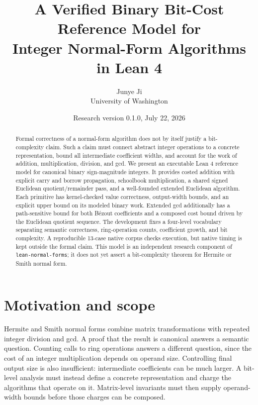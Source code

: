 \documentclass[11pt]{article}
\title{A Verified Binary Bit-Cost Reference Model for\\
Integer Normal-Form Algorithms in Lean 4}
\author{Junye Ji\\University of Washington}
\date{Research version 0.1.0, July 22, 2026}
\newcommand{\code}[1]{\texttt{#1}}
\begin{document}
\maketitle

\begin{abstract}
Formal correctness of a normal-form algorithm does not by itself justify a
bit-complexity claim.  Such a claim must connect abstract integer operations
to a concrete representation, bound all intermediate coefficient widths, and
account for the work of addition, multiplication, division, and gcd.  We
present an executable Lean 4 reference model for canonical binary
sign-magnitude integers.  It provides costed addition with explicit carry and
borrow propagation, schoolbook multiplication, a shared signed Euclidean
quotient/remainder pass, and a well-founded extended Euclidean algorithm.
Each primitive has kernel-checked value correctness, output-width bounds, and
an explicit upper bound on its modeled binary work.  Extended gcd additionally
has a path-sensitive bound for both B\'ezout coefficients and a composed cost
bound driven by the Euclidean quotient sequence.  The development fixes a
four-level vocabulary separating semantic correctness, ring-operation counts,
coefficient growth, and bit complexity.  A reproducible 13-case native corpus
checks execution, but native timing is kept outside the formal claim.  This
model is an independent research component of \code{lean-normal-forms}; it
does not yet assert a bit-complexity theorem for Hermite or Smith normal form.
\end{abstract}

\section{Motivation and scope}

Hermite and Smith normal forms combine matrix transformations with repeated
integer division and gcd.  A proof that the result is canonical answers a
semantic question.  Counting calls to ring operations answers a different
question, since the cost of an integer multiplication depends on operand
size.  Controlling final output size is also insufficient: intermediate
coefficients can be much larger.  A bit-level analysis must instead define a
concrete representation and charge the algorithms that operate on it.
Matrix-level invariants must then supply operand-width bounds before those
charges can be composed.
\end{document}
